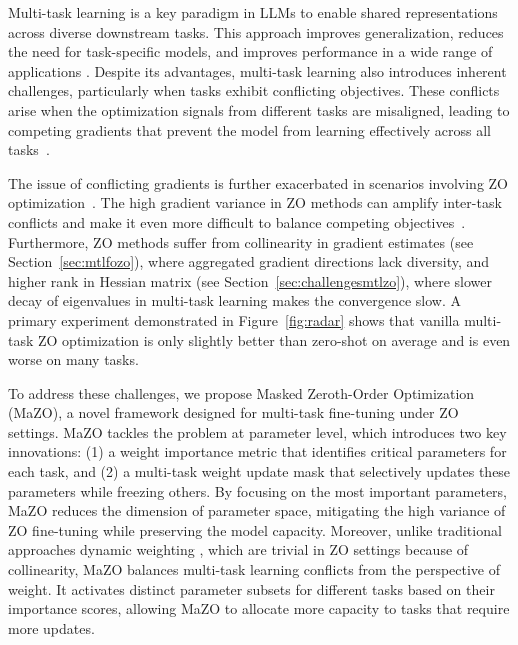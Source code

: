 Multi-task learning is a key paradigm in LLMs to enable shared representations across diverse downstream tasks. This approach improves generalization, reduces the need for task-specific models, and improves performance in a wide range of applications \citep{zhang-etal-2023-survey, radford2019language}. Despite its advantages, multi-task learning also introduces inherent challenges, particularly when tasks exhibit conflicting objectives. These conflicts arise when the optimization signals from different tasks are misaligned, leading to competing gradients that prevent the model from learning effectively across all tasks~\citep{sener2018multi,Mahapatra2020MultiTaskLW,crawshaw2020multi,9382101, shi2023recon}.

The issue of conflicting gradients is further exacerbated in scenarios involving ZO optimization~\cite{liu2020primer,malladi2023mezo}. The high gradient variance in ZO methods can amplify inter-task conflicts and make it even more difficult to balance competing objectives~\citep{zhang2024convergence}. Furthermore, ZO methods suffer from collinearity in gradient estimates (see Section~\ref{sec:mtlfozo}), where aggregated gradient directions lack diversity, and higher rank in Hessian matrix (see Section~\ref{sec:challengesmtlzo}), where slower decay of eigenvalues in multi-task learning makes the convergence slow. A primary experiment demonstrated in Figure~\ref{fig:radar} shows that vanilla multi-task ZO optimization is only slightly better than zero-shot on average and is even worse on many tasks.







To address these challenges, we propose Masked Zeroth-Order Optimization (MaZO), a novel framework designed for multi-task fine-tuning under ZO settings. MaZO tackles the problem at parameter level, which introduces two key innovations: (1) a weight importance metric that identifies critical parameters for each task, and (2) a multi-task weight update mask that selectively updates these parameters while freezing others. By focusing on the most important parameters, MaZO reduces the dimension of parameter space, mitigating the high variance of ZO fine-tuning while preserving the model capacity. Moreover, unlike traditional approaches dynamic weighting \citep{chen2018gradnorm,liu2024famo,AGHAJANZADEH2023109587}, which are trivial in ZO settings because of collinearity, MaZO balances multi-task learning conflicts from the perspective of weight. It activates distinct parameter subsets for different tasks based on their importance scores, allowing MaZO to allocate more capacity to tasks that require more updates.


